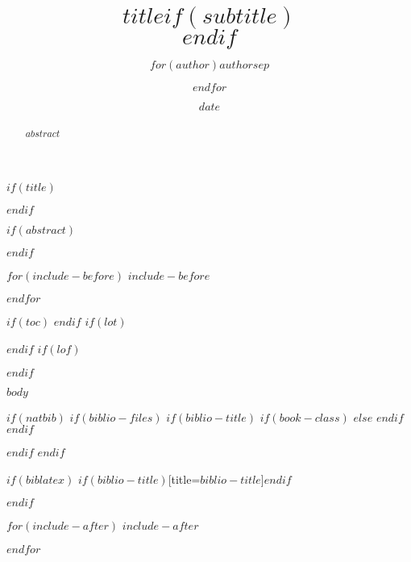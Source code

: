 \documentclass[$if(fontsize)$$fontsize$,$endif$$if(lang)$$lang$,$endif$$if(papersize)$$papersize$,$endif$$for(classoption)$$classoption$$sep$,$endfor$]{$documentclass$}
\title{$title$$if(subtitle)$\\\vspace{0.5em}{\large $subtitle$}$endif$}
\author{$for(author)$$author$$sep$ \and $endfor$}
\date{$date$}
\begin{document}
$if(title)$
\maketitle
$endif$

$if(abstract)$
\begin{abstract}
$abstract$
\end{abstract}
$endif$

$for(include-before)$
$include-before$

$endfor$

$if(toc)$
{
\hypersetup{linkcolor=black}
\setcounter{tocdepth}{$toc-depth$}
\tableofcontents
}
$endif$
$if(lot)$
\listoftables
$endif$
$if(lof)$
\listoffigures
$endif$

$body$

$if(natbib)$
$if(biblio-files)$
$if(biblio-title)$
$if(book-class)$
\renewcommand\bibname{$biblio-title$}
$else$
\renewcommand\refname{$biblio-title$}
$endif$
$endif$

$endif$
$endif$

$if(biblatex)$
\printbibliography$if(biblio-title)$[title=$biblio-title$]$endif$

$endif$

$for(include-after)$
$include-after$

$endfor$
\end{document}
